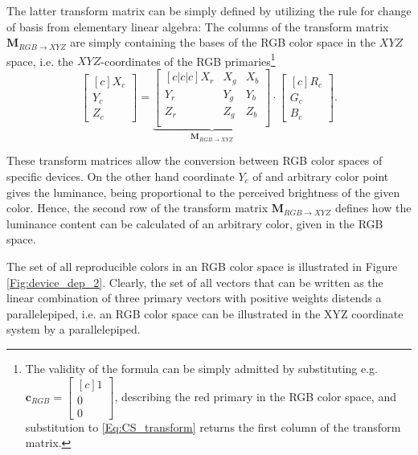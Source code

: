 The latter transform matrix can be simply defined by utilizing the rule for change of basis from elementary linear algebra:
The columns of the transform matrix $\mathbf{M}_{R\!G\!B \rightarrow X\!Y\!Z}$ are simply containing the bases of the RGB color space in the $XYZ$ space, i.e. the $XYZ$-coordinates of the RGB primaries\footnote{
The validity of the formula can be simply admitted by substituting e.g. $\mathbf{c}_{RGB} = \begin{bmatrix}[c]
       1 \\[0.3em]
       0 \\[0.3em]
       0 \end{bmatrix}$, describing the red primary in the RGB color space, and substitution to \eqref{Eq:CS_transform} returns the first column of the transform matrix.}
\begin{equation}
\begin{bmatrix}[c]
       X_c \\[0.3em]
       Y_c \\[0.3em]
       Z_c \end{bmatrix}
       = 
       \underbrace{
  \begin{bmatrix}[c|c|c]
   X_r & X_g & X_b  \\
   Y_r & Y_g & Y_b \\
   Z_r & Z_g & Z_b  \\
\end{bmatrix}}_{\mathbf{M}_{R\!G\!B \rightarrow X\!Y\!Z}}
\cdot
\begin{bmatrix}[c]
       R_c \\[0.3em]
       G_c \\[0.3em]
       B_c \end{bmatrix}.
\label{Eq:CS_transform}
\end{equation}

These transform matrices allow the conversion between RGB color spaces of specific devices.
On the other hand coordinate $Y_c$ of and arbitrary color point gives the luminance, being proportional to the perceived brightness of the given color.
Hence, the second row of the transform matrix $\mathbf{M}_{R\!G\!B \rightarrow X\!Y\!Z}$ defines how the luminance content can be calculated of an arbitrary color, given in the RGB space.

\vspace{3mm}
The set of all reproducible colors in an RGB color space is illustrated in Figure \ref{Fig:device_dep_2}.
Clearly, the set of all vectors that can be written as the linear combination of three primary vectors with positive weights distends a parallelepiped, i.e. an RGB color space can be illustrated in the XYZ coordinate system by a parallelepiped.

